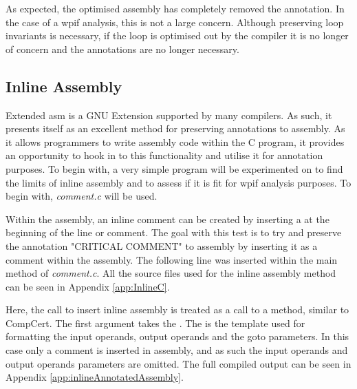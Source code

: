 

As expected, the optimised assembly has completely removed the annotation. In the case of a wpif analysis, this is not a large concern. Although preserving loop invariants is necessary, if the loop is optimised out by the compiler it is no longer of concern and the annotations are no longer necessary.


\subsection{Inline Assembly}
\label{subsec:inlineAssembly}

Extended asm is a GNU Extension supported by many compilers. As such, it presents itself as an excellent method for preserving annotations to assembly. As it allows programmers to write assembly code within the C program, it provides an opportunity to hook in to this functionality and utilise it for annotation purposes. To begin with, a very simple program will be experimented on to find the limits of inline assembly and to assess if it is fit for wpif analysis purposes. To begin with, \textit{comment.c} will be used.

Within the assembly, an inline comment can be created by inserting a \code{\#} at the beginning of the line or comment. The goal with this test is to try and preserve the annotation "CRITICAL COMMENT" to assembly by inserting it as a comment within the assembly. The following line was inserted within the main method of \textit{comment.c}. All the source files used for the inline assembly method can be seen in Appendix \ref{app:InlineC}.



Here, the call to insert inline assembly is treated as a call to a method, similar to CompCert. The first argument takes the . The  is the template used for formatting the input operands, output operands and the goto parameters. In this case only a comment is inserted in assembly, and as such the input operands and output operands parameters are omitted. The full compiled output can be seen in Appendix \ref{app:inlineAnnotatedAssembly}.



